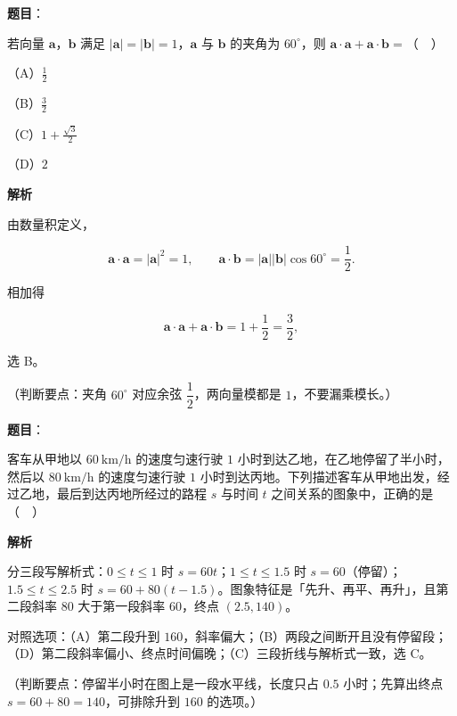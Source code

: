 \begin{answer}

\textbf{题目}：

若向量 $\boldsymbol a$，$\boldsymbol b$ 满足 $|\boldsymbol a|=|\boldsymbol b|=1$，$\boldsymbol a$ 与 $\boldsymbol b$ 的夹角为 $60^\circ$，则 $\boldsymbol a\cdot\boldsymbol a+\boldsymbol a\cdot\boldsymbol b=$（　）

（A）$\frac12$

（B）$\frac32$

（C）$1+\frac{\sqrt3}{2}$

（D）$2$

\textbf{解析}

由数量积定义，

\nopagebreak[4]
\[\boldsymbol a\cdot\boldsymbol a=|\boldsymbol a|^2=1,\qquad \boldsymbol a\cdot\boldsymbol b=|\boldsymbol a||\boldsymbol b|\cos60^\circ=\frac12.\]

相加得

\nopagebreak[4]
\[\boldsymbol a\cdot\boldsymbol a+\boldsymbol a\cdot\boldsymbol b=1+\frac12=\frac32,\]

选 B。

（判断要点：夹角 $60^\circ$ 对应余弦 $\dfrac12$，两向量模都是 $1$，不要漏乘模长。）


\end{answer}
\begin{answer}

\textbf{题目}：

客车从甲地以 $60\ \mathrm{km/h}$ 的速度匀速行驶 $1$ 小时到达乙地，在乙地停留了半小时，然后以 $80\ \mathrm{km/h}$ 的速度匀速行驶 $1$ 小时到达丙地。下列描述客车从甲地出发，经过乙地，最后到达丙地所经过的路程 $s$ 与时间 $t$ 之间关系的图象中，正确的是（　）
\nopagebreak[4]
\begin{center}\end{center}
\nopagebreak[4]
\textbf{解析}

分三段写解析式：$0\leqslant t\leqslant1$ 时 $s=60t$；$1\leqslant t\leqslant1.5$ 时 $s=60$（停留）；$1.5\leqslant t\leqslant2.5$ 时 $s=60+80(t-1.5)$。图象特征是「先升、再平、再升」，且第二段斜率 $80$ 大于第一段斜率 $60$，终点 $(2.5,140)$。

对照选项：（A）第二段升到 $160$，斜率偏大；（B）两段之间断开且没有停留段；（D）第二段斜率偏小、终点时间偏晚；（C）三段折线与解析式一致，选 C。

（判断要点：停留半小时在图上是一段水平线，长度只占 $0.5$ 小时；先算出终点 $s=60+80=140$，可排除升到 $160$ 的选项。）


\end{answer}
